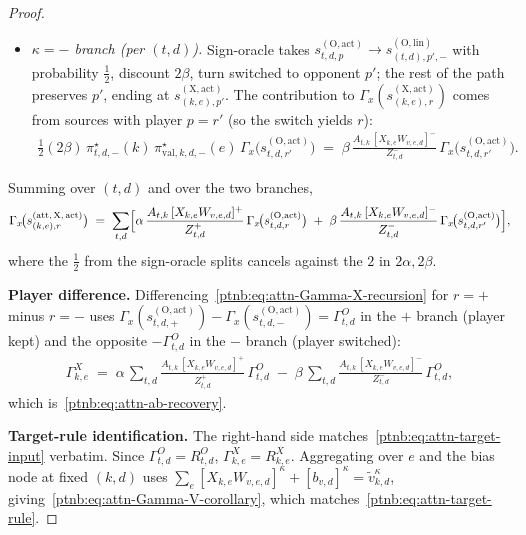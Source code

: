 \begin{proof}
\begin{itemize}
\begin{align}
            &=\; \alpha\, \frac{A_{t,k}\, [X_{k,e} W_{v,e,d}]^+}{Z_{t,d}^+}\,
            \Gamma_x\!\bigl(s_{t,d,r}^{(\mathrm{O},\mathrm{act})}\bigr),
        \end{align}
        where the $\tilde{v}_{k,d}^+$ in numerator and denominator cancel.
    \item \emph{$\kappa = -$ branch (per $(t,d)$).} Sign-oracle takes $s_{t,d,p}^{(\mathrm{O},\mathrm{act})}
            \to s_{(t,d),p',-}^{(\mathrm{O},\mathrm{lin})}$ with probability $\tfrac12$, discount $2\beta$,
        turn switched to opponent $p'$; the rest of the path preserves $p'$, ending at
        $s_{(k,e),p'}^{(\mathrm{X},\mathrm{act})}$. The contribution to
        $\Gamma_x(s_{(k,e),r}^{(\mathrm{X},\mathrm{act})})$ comes from sources with player $p = r'$ (so the
        switch yields $r$):
        \begin{align}
            \tfrac12 (2\beta)\, \pi_{t,d,-}^\star(k)\, \pi_{\mathrm{val},k,d,-}^\star(e)\,
            \Gamma_x\!\bigl(s_{t,d,r'}^{(\mathrm{O},\mathrm{act})}\bigr)
            \;=\; \beta\, \frac{A_{t,k}\, [X_{k,e} W_{v,e,d}]^-}{Z_{t,d}^-}\,
            \Gamma_x\!\bigl(s_{t,d,r'}^{(\mathrm{O},\mathrm{act})}\bigr).
        \end{align}
\end{itemize}
Summing over $(t,d)$ and over the two branches,
\begin{align}\label{ptnb:eq:attn-Gamma-X-recursion}
    \Gamma_x\!\bigl(s_{(k,e),r}^{(\mathrm{att},\,\mathrm{X},\,\mathrm{act})}\bigr)
    \;=\; \sum_{t,d} \Bigl[
    \alpha\, \frac{A_{t,k}\, [X_{k,e} W_{v,e,d}]^+}{Z_{t,d}^+}\,
    \Gamma_x\!\bigl(s_{t,d,r}^{(\mathrm{O},\mathrm{act})}\bigr)
    \;+\;
    \beta\, \frac{A_{t,k}\, [X_{k,e} W_{v,e,d}]^-}{Z_{t,d}^-}\,
    \Gamma_x\!\bigl(s_{t,d,r'}^{(\mathrm{O},\mathrm{act})}\bigr)
    \Bigr],
\end{align}
where the $\tfrac12$ from the sign-oracle splits cancels against the $2$ in $2\alpha, 2\beta$.

\textbf{Player difference.} Differencing~\eqref{ptnb:eq:attn-Gamma-X-recursion} for $r{=}+$ minus
$r{=}-$ uses $\Gamma_x(s_{t,d,+}^{(\mathrm{O},\mathrm{act})}) -
    \Gamma_x(s_{t,d,-}^{(\mathrm{O},\mathrm{act})}) = \Gamma^{O}_{t,d}$ in the $+$ branch (player kept)
and the opposite $-\Gamma^{O}_{t,d}$ in the $-$ branch (player switched):
\begin{align}
    \Gamma^{X}_{k,e}
    \;=\; \alpha\, \sum_{t,d} \frac{A_{t,k}\, [X_{k,e} W_{v,e,d}]^+}{Z_{t,d}^+}\, \Gamma^{O}_{t,d}
    \;-\; \beta\, \sum_{t,d} \frac{A_{t,k}\, [X_{k,e} W_{v,e,d}]^-}{Z_{t,d}^-}\, \Gamma^{O}_{t,d},
\end{align}
which is~\eqref{ptnb:eq:attn-ab-recovery}.

\textbf{Target-rule identification.} The right-hand side matches~\eqref{ptnb:eq:attn-target-input}
verbatim. Since $\Gamma^{O}_{t,d} = R^{O}_{t,d}$, $\Gamma^{X}_{k,e} = R^{X}_{k,e}$. Aggregating
over $e$ and the bias node at fixed $(k,d)$ uses $\sum_e [X_{k,e} W_{v,e,d}]^\kappa +
    [b_{v,d}]^\kappa = \tilde{v}_{k,d}^\kappa$, giving~\eqref{ptnb:eq:attn-Gamma-V-corollary}, which
matches~\eqref{ptnb:eq:attn-target-rule}.
\end{proof}

